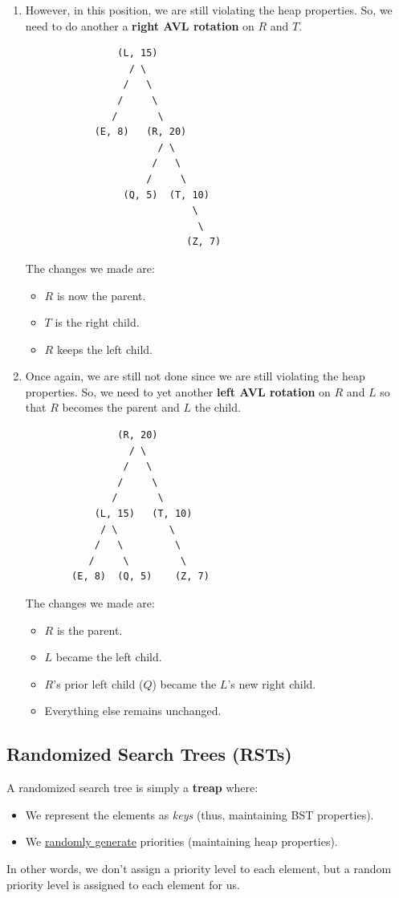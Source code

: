 \documentclass[letterpaper]{article}
\begin{document}
\begin{enumerate}[(1)]
    \item However, in this position, we are still violating the heap properties. So, we need to do another a \textbf{right AVL rotation} on $R$ and $T$.
    \begin{verbatim}
                (L, 15)
                  / \ 
                 /   \ 
                /     \ 
               /       \ 
            (E, 8)   (R, 20)
                       / \ 
                      /   \ 
                     /     \ 
                 (Q, 5)  (T, 10)
                             \ 
                              \ 
                            (Z, 7)
    \end{verbatim} 
    The changes we made are: 
    \begin{itemize}
        \item $R$ is now the parent. 
        \item $T$ is the right child. 
        \item $R$ keeps the left child. 
    \end{itemize}

    \item Once again, we are still not done since we are still violating the heap properties. So, we need to yet another \textbf{left AVL rotation} on $R$ and $L$ so that $R$ becomes the parent and $L$ the child. 
    \begin{verbatim}
                (R, 20)
                  / \ 
                 /   \ 
                /     \ 
               /       \ 
            (L, 15)   (T, 10)
             / \         \ 
            /   \         \ 
           /     \         \ 
        (E, 8)  (Q, 5)    (Z, 7)
    \end{verbatim} 
    The changes we made are: 
    \begin{itemize}
        \item $R$ is the parent. 
        \item $L$ became the left child. 
        \item $R$'s prior left child ($Q$) became the $L$'s new right child.
        \item Everything else remains unchanged.  
    \end{itemize}

\end{enumerate}


\subsection{Randomized Search Trees (RSTs)}
A randomized search tree is simply a \textbf{treap} where:
\begin{itemize}
    \item We represent the elements as \emph{keys} (thus, maintaining BST properties). 
    \item We \underline{randomly generate} priorities (maintaining heap properties). 
\end{itemize}
In other words, we don't assign a priority level to each element, but a random priority level is assigned to each element for us. 
\end{document}
